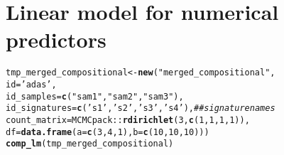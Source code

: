\documentclass{article}\usepackage[]{graphicx}\usepackage[]{color}
\makeatletter
\newcommand{\hlnum}[1]{\textcolor[rgb]{0.686,0.059,0.569}{#1}}%
\newcommand{\hlstr}[1]{\textcolor[rgb]{0.192,0.494,0.8}{#1}}%
\newcommand{\hlcom}[1]{\textcolor[rgb]{0.678,0.584,0.686}{\textit{#1}}}%
\newcommand{\hlopt}[1]{\textcolor[rgb]{0,0,0}{#1}}%
\newcommand{\hlstd}[1]{\textcolor[rgb]{0.345,0.345,0.345}{#1}}%
\newcommand{\hlkwb}[1]{\textcolor[rgb]{0.69,0.353,0.396}{#1}}%
\newcommand{\hlkwc}[1]{\textcolor[rgb]{0.333,0.667,0.333}{#1}}%
\newcommand{\hlkwd}[1]{\textcolor[rgb]{0.737,0.353,0.396}{\textbf{#1}}}%
\newenvironment{kframe}{%
 \def\at@end@of@kframe{}%
 \ifinner\ifhmode%
  \def\at@end@of@kframe{\end{minipage}}%
  \begin{minipage}{\columnwidth}%
 \fi\fi%
 \def\FrameCommand##1{\hskip\@totalleftmargin \hskip-\fboxsep
 \colorbox{shadecolor}{##1}\hskip-\fboxsep
     \hskip-\linewidth \hskip-\@totalleftmargin \hskip\columnwidth}%
 \MakeFramed {\advance\hsize-\width
   \@totalleftmargin\z@ \linewidth\hsize
   \@setminipage}}%
 {\par\unskip\endMakeFramed%
 \at@end@of@kframe}
\newenvironment{knitrout}{}{} %
\makeatother
\begin{document}
\section{Linear model for numerical predictors}
\begin{knitrout}
\color{fgcolor}\begin{kframe}
\begin{alltt}
\hlstd{tmp_merged_compositional} \hlkwb{<-} \hlkwd{new}\hlstd{(}\hlstr{"merged_compositional"}\hlstd{,}
                                \hlkwc{id}\hlstd{=}\hlstr{'adas'}\hlstd{,}
                                \hlkwc{id_samples}\hlstd{=}\hlkwd{c}\hlstd{(}\hlstr{"sam1"}\hlstd{,} \hlstr{"sam2"}\hlstd{,} \hlstr{"sam3"}\hlstd{),}
                                \hlkwc{id_signatures}\hlstd{=} \hlkwd{c}\hlstd{(}\hlstr{'s1'}\hlstd{,} \hlstr{'s2'}\hlstd{,} \hlstr{'s3'}\hlstd{,} \hlstr{'s4'}\hlstd{),} \hlcom{## signature names}
                                \hlkwc{count_matrix}\hlstd{=MCMCpack}\hlopt{::}\hlkwd{rdirichlet}\hlstd{(}\hlnum{3}\hlstd{,} \hlkwd{c}\hlstd{(}\hlnum{1}\hlstd{,}\hlnum{1}\hlstd{,}\hlnum{1}\hlstd{,}\hlnum{1}\hlstd{)),}
                                \hlkwc{df}\hlstd{=}\hlkwd{data.frame}\hlstd{(}\hlkwc{a}\hlstd{=}\hlkwd{c}\hlstd{(}\hlnum{3}\hlstd{,}\hlnum{4}\hlstd{,}\hlnum{1}\hlstd{),} \hlkwc{b}\hlstd{=}\hlkwd{c}\hlstd{(}\hlnum{10}\hlstd{,} \hlnum{10}\hlstd{,} \hlnum{10}\hlstd{)))}
\hlkwd{comp_lm}\hlstd{(tmp_merged_compositional)}
\end{alltt}


{\ttfamily\noindent\bfseries\color{errorcolor}{\#\# Error: 'lm' is not an exported object from 'namespace:compositions'}}\end{kframe}
\end{knitrout}
\end{document}
